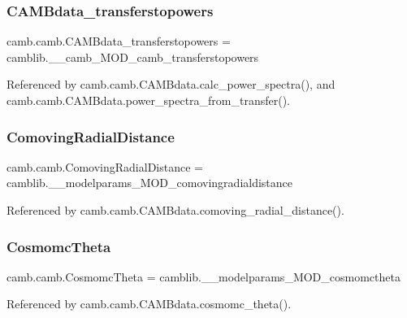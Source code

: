 \subsubsection{\texorpdfstring{C\+A\+M\+Bdata\+\_\+transferstopowers}{CAMBdata\_transferstopowers}}
{\footnotesize\ttfamily camb.\+camb.\+C\+A\+M\+Bdata\+\_\+transferstopowers = camblib.\+\_\+\+\_\+camb\+\_\+\+M\+O\+D\+\_\+camb\+\_\+transferstopowers}



Referenced by camb.\+camb.\+C\+A\+M\+Bdata.\+calc\+\_\+power\+\_\+spectra(), and camb.\+camb.\+C\+A\+M\+Bdata.\+power\+\_\+spectra\+\_\+from\+\_\+transfer().

\mbox{\label{namespacecamb_1_1camb_abea45cf46d041a2594299ddef0e2fee2}} 
\subsubsection{\texorpdfstring{Comoving\+Radial\+Distance}{ComovingRadialDistance}}
{\footnotesize\ttfamily camb.\+camb.\+Comoving\+Radial\+Distance = camblib.\+\_\+\+\_\+modelparams\+\_\+\+M\+O\+D\+\_\+comovingradialdistance}



Referenced by camb.\+camb.\+C\+A\+M\+Bdata.\+comoving\+\_\+radial\+\_\+distance().

\mbox{\label{namespacecamb_1_1camb_a4fe51e1298e6523912383946cb843e5a}} 
\subsubsection{\texorpdfstring{Cosmomc\+Theta}{CosmomcTheta}}
{\footnotesize\ttfamily camb.\+camb.\+Cosmomc\+Theta = camblib.\+\_\+\+\_\+modelparams\+\_\+\+M\+O\+D\+\_\+cosmomctheta}



Referenced by camb.\+camb.\+C\+A\+M\+Bdata.\+cosmomc\+\_\+theta().

\mbox{\label{namespacecamb_1_1camb_a44bc6eb27388b576f6c26774a6ebe166}} 
